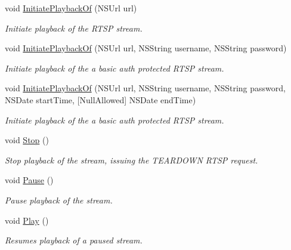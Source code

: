 \begin{DoxyCompactItemize}
\item 
void \hyperlink{interface_surge_xamarini_o_s_bindings_1_1_surge_rtsp_player_a7c2572b559c1758415a21c0bde4417be}{Initiate\+Playback\+Of} (N\+S\+Url url)
\begin{DoxyCompactList}\small\item\em Initiate playback of the R\+T\+SP stream. \end{DoxyCompactList}\item 
void \hyperlink{interface_surge_xamarini_o_s_bindings_1_1_surge_rtsp_player_aed2fc640fe87633d54ba35a618b1240d}{Initiate\+Playback\+Of} (N\+S\+Url url, N\+S\+String username, N\+S\+String password)
\begin{DoxyCompactList}\small\item\em Initiate playback of the a basic auth protected R\+T\+SP stream. \end{DoxyCompactList}\item 
void \hyperlink{interface_surge_xamarini_o_s_bindings_1_1_surge_rtsp_player_a618a2429722fc8264e546c64155ad7b3}{Initiate\+Playback\+Of} (N\+S\+Url url, N\+S\+String username, N\+S\+String password, N\+S\+Date start\+Time, \mbox{[}Null\+Allowed\mbox{]} N\+S\+Date end\+Time)
\begin{DoxyCompactList}\small\item\em Initiate playback of the a basic auth protected R\+T\+SP stream. \end{DoxyCompactList}\item 
void \hyperlink{interface_surge_xamarini_o_s_bindings_1_1_surge_rtsp_player_ac4cb8b34437ee896e4529cddca339bed}{Stop} ()
\begin{DoxyCompactList}\small\item\em Stop playback of the stream, issuing the T\+E\+A\+R\+D\+O\+WN R\+T\+SP request. \end{DoxyCompactList}\item 
void \hyperlink{interface_surge_xamarini_o_s_bindings_1_1_surge_rtsp_player_aeca3aa0d7ea965edc178403416694c5b}{Pause} ()
\begin{DoxyCompactList}\small\item\em Pause playback of the stream. \end{DoxyCompactList}\item 
void \hyperlink{interface_surge_xamarini_o_s_bindings_1_1_surge_rtsp_player_a3f7d8277f7aa65454732afd623ee53af}{Play} ()
\begin{DoxyCompactList}\small\item\em Resumes playback of a paused stream. \end{DoxyCompactList}\end{DoxyCompactItemize}

